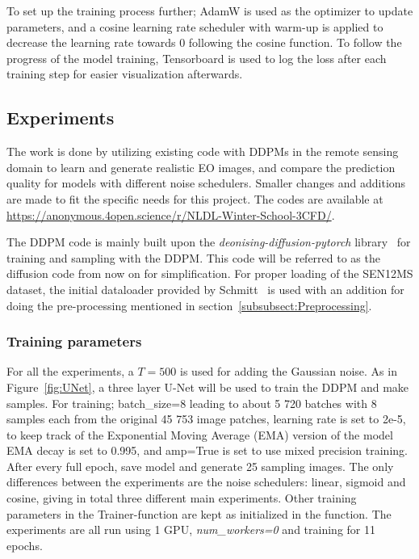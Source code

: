 \documentclass[fullpaper]{nldl}
\begin{document}
To set up the training process further; AdamW is used as the optimizer to update parameters, and a cosine learning rate scheduler with warm-up is applied to decrease the learning rate towards 0 following the cosine function. To follow the progress of the model training, Tensorboard is used to log the loss after each training step for easier visualization afterwards.


\subsection{Experiments}
\label{subsect:Experiments}
The work is done by utilizing existing code with DDPMs in the remote sensing domain to learn and generate realistic EO images, and compare the prediction quality for models with different noise schedulers. Smaller changes and additions are made to fit the specific needs for this project. The codes are available at \url{https://anonymous.4open.science/r/NLDL-Winter-School-3CFD/}.

The DDPM code is mainly built upon the \textit{deonising-diffusion-pytorch} library~\cite{lucidrains2024} for training and sampling with the DDPM. This code will be referred to as the diffusion code from now on for simplification. For proper loading of the SEN12MS dataset, the initial dataloader provided by Schmitt~\cite{ScmittSEN12MSdataset} is used with an addition for doing the pre-processing mentioned in section~\ref{subsubsect:Preprocessing}.


\subsubsection{Training parameters}
\label{subsubsect:Training Params}
For all the experiments, a $T=500$ is used for adding the Gaussian noise. As in Figure~\ref{fig:UNet}, a three layer U-Net will be used to train the DDPM and make samples. For training; batch\_size=8 leading to about 5 720 batches with 8 samples each from the original 45 753 image patches, learning rate is set to 2e-5, to keep track of the Exponential Moving Average (EMA) version of the model EMA decay is set to 0.995, and amp=True is set to use mixed precision training. After every full epoch, save model and generate 25 sampling images. The only differences between the experiments are the noise schedulers: linear, sigmoid and cosine, giving in total three different main experiments. Other training parameters in the Trainer-function are kept as initialized in the function. The experiments are all run using 1 GPU, \textit{num\_workers=0} and training for 11 epochs.
\end{document}
